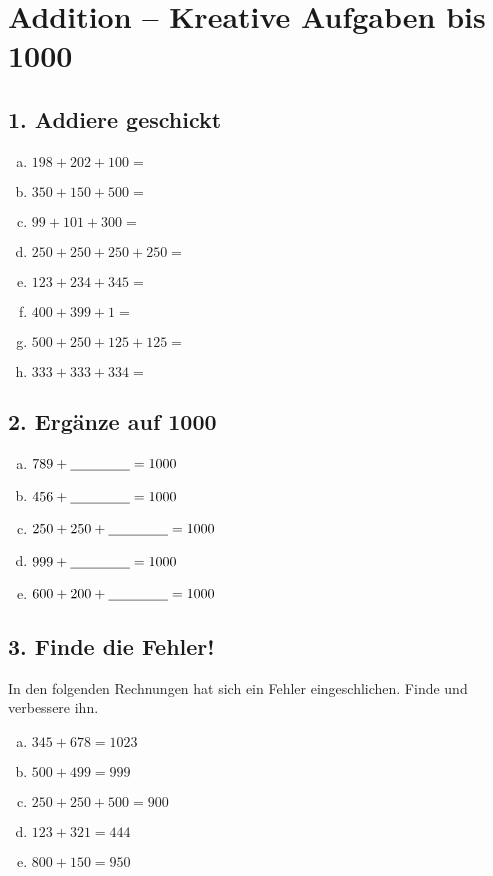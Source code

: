 
\section*{Addition – Kreative Aufgaben bis 1000}

\subsection*{1. Addiere geschickt}
\begin{enumerate}[a)]
    \item $198 + 202 + 100 =$
    \item $350 + 150 + 500 =$
    \item $99 + 101 + 300 =$
    \item $250 + 250 + 250 + 250 =$
    \item $123 + 234 + 345 =$
    \item $400 + 399 + 1 =$
    \item $500 + 250 + 125 + 125 =$
    \item $333 + 333 + 334 =$
\end{enumerate}

\subsection*{2. Ergänze auf 1000}
\begin{enumerate}[a)]
    \item $789 + \underline{\hspace{1.5cm}} = 1000$
    \item $456 + \underline{\hspace{1.5cm}} = 1000$
    \item $250 + 250 + \underline{\hspace{1.5cm}} = 1000$
    \item $999 + \underline{\hspace{1.5cm}} = 1000$
    \item $600 + 200 + \underline{\hspace{1.5cm}} = 1000$
\end{enumerate}

\subsection*{3. Finde die Fehler!}
In den folgenden Rechnungen hat sich ein Fehler eingeschlichen. Finde und verbessere ihn.
\begin{enumerate}[a)]
    \item $345 + 678 = 1023$
    \item $500 + 499 = 999$
    \item $250 + 250 + 500 = 900$
    \item $123 + 321 = 444$
    \item $800 + 150 = 950$
\end{enumerate}

